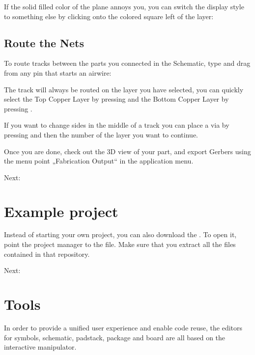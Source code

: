 \documentclass[letterpaper,10pt,czech]{sphinxmanual}
\begin{document}
If the solid filled color of the plane annoys you, you can switch the display style to something else by clicking onto the colored square left of the layer:

\noindent{}


\section{Route the Nets}
\label{\detokenize{create-board:route-the-nets}}
To route tracks between the parts you connected in the Schematic, type  and drag from any pin that starts an airwire:



The track will always be routed on the layer you have selected, you can quickly select the Top Copper Layer by pressing  and the Bottom Copper Layer by pressing .

If you want to change sides in the middle of a track you can place a via by pressing  and then the number of the layer you want to continue.

Once you are done, check out the 3D view of your part, and export Gerbers using the menu point „Fabrication Output“ in the application menu.

\noindent{}

Next: {\hyperref[\detokenize{example-project::doc}]{}}


\chapter{Example project}
\label{\detokenize{example-project:example-project}}\label{\detokenize{example-project::doc}}
Instead of starting your own project, you can also download the . To open
it, point the project manager to the  file. Make sure that
you extract all the files contained in that repository.

Next: {\hyperref[\detokenize{tools::doc}]{}}


\chapter{Tools}
\label{\detokenize{tools:tools}}\label{\detokenize{tools::doc}}
In order to provide a unified user experience and enable code reuse, the
editors for symbols, schematic, padstack, package and board are all
based on the interactive manipulator.
\end{document}
